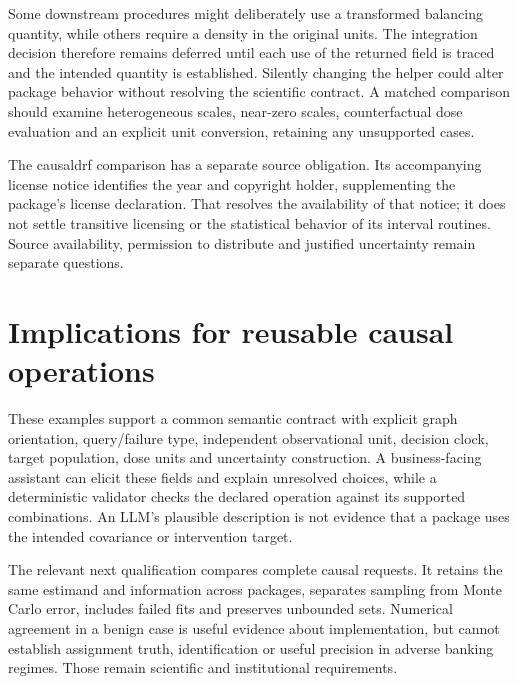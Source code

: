 Some downstream procedures might deliberately use a transformed balancing
quantity, while others require a density in the original units. The integration
decision therefore remains deferred until each use of the returned field is
traced and the intended quantity is established. Silently changing the helper
could alter package behavior without resolving the scientific contract. A
matched comparison should examine heterogeneous scales, near-zero scales,
counterfactual dose evaluation and an explicit unit conversion, retaining any
unsupported cases.

The causaldrf comparison has a separate source obligation. Its accompanying
license notice identifies the year and copyright holder, supplementing the
package's license declaration. That resolves the availability of that notice;
it does not settle transitive licensing or the statistical behavior of its
interval routines. Source availability, permission to distribute and justified
uncertainty remain separate questions.\cite{v131_sw_causaldrf}

\section{Implications for reusable causal operations}

These examples support a common semantic contract with explicit graph
orientation, query/failure type, independent observational unit, decision clock,
target population, dose units and uncertainty construction. A business-facing
assistant can elicit these fields and explain unresolved choices, while a
deterministic validator checks the declared operation against its supported
combinations. An LLM's plausible description is not evidence that a package
uses the intended covariance or intervention target.

The relevant next qualification compares complete causal requests. It retains
the same estimand and information across packages, separates sampling from
Monte Carlo error, includes failed fits and preserves unbounded sets. Numerical
agreement in a benign case is useful evidence about implementation, but cannot
establish assignment truth, identification or useful precision in adverse
banking regimes. Those remain scientific and institutional requirements.
